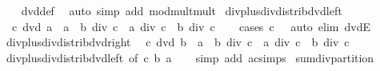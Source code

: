 \begin{isabellebody}
%
\isadelimproof
\ \ %
\endisadelimproof
%
\isatagproof
{}\isamarkupfalse%
\ dvd{\isacharunderscore}{\kern0pt}def\ \isamarkupfalse%
\ {\isacharparenleft}{\kern0pt}auto\ simp\ add{\isacharcolon}{\kern0pt}\ mod{\isacharunderscore}{\kern0pt}mult{\isacharunderscore}{\kern0pt}mult{}{\isacharparenright}{\kern0pt}%
\endisatagproof
{\isafoldproof}%
%
\isadelimproof
\isanewline
%
\endisadelimproof
\isanewline
{}\isamarkupfalse%
\ div{\isacharunderscore}{\kern0pt}plus{\isacharunderscore}{\kern0pt}div{\isacharunderscore}{\kern0pt}distrib{\isacharunderscore}{\kern0pt}dvd{\isacharunderscore}{\kern0pt}left{\isacharcolon}{\kern0pt}\isanewline
\ \ {\isachardoublequoteopen}c\ dvd\ a\ {\isasymLongrightarrow}\ {\isacharparenleft}{\kern0pt}a\ {\isacharplus}{\kern0pt}\ b{\isacharparenright}{\kern0pt}\ div\ c\ {\isacharequal}{\kern0pt}\ a\ div\ c\ {\isacharplus}{\kern0pt}\ b\ div\ c{\isachardoublequoteclose}\isanewline
%
\isadelimproof
\ \ %
\endisadelimproof
%
\isatagproof
{}\isamarkupfalse%
\ {\isacharparenleft}{\kern0pt}cases\ {\isachardoublequoteopen}c\ {\isacharequal}{\kern0pt}\ {}{\isachardoublequoteclose}{\isacharparenright}{\kern0pt}\ {\isacharparenleft}{\kern0pt}auto\ elim{\isacharcolon}{\kern0pt}\ dvdE{\isacharparenright}{\kern0pt}%
\endisatagproof
{\isafoldproof}%
%
\isadelimproof
\isanewline
%
\endisadelimproof
\isanewline
{}\isamarkupfalse%
\ div{\isacharunderscore}{\kern0pt}plus{\isacharunderscore}{\kern0pt}div{\isacharunderscore}{\kern0pt}distrib{\isacharunderscore}{\kern0pt}dvd{\isacharunderscore}{\kern0pt}right{\isacharcolon}{\kern0pt}\isanewline
\ \ {\isachardoublequoteopen}c\ dvd\ b\ {\isasymLongrightarrow}\ {\isacharparenleft}{\kern0pt}a\ {\isacharplus}{\kern0pt}\ b{\isacharparenright}{\kern0pt}\ div\ c\ {\isacharequal}{\kern0pt}\ a\ div\ c\ {\isacharplus}{\kern0pt}\ b\ div\ c{\isachardoublequoteclose}\isanewline
%
\isadelimproof
\ \ %
\endisadelimproof
%
\isatagproof
{}\isamarkupfalse%
\ div{\isacharunderscore}{\kern0pt}plus{\isacharunderscore}{\kern0pt}div{\isacharunderscore}{\kern0pt}distrib{\isacharunderscore}{\kern0pt}dvd{\isacharunderscore}{\kern0pt}left\ {\isacharbrackleft}{\kern0pt}of\ c\ b\ a{\isacharbrackright}{\kern0pt}\isanewline
\ \ \isamarkupfalse%
\ {\isacharparenleft}{\kern0pt}simp\ add{\isacharcolon}{\kern0pt}\ ac{\isacharunderscore}{\kern0pt}simps{\isacharparenright}{\kern0pt}%
\endisatagproof
{\isafoldproof}%
%
\isadelimproof
\isanewline
%
\endisadelimproof
\isanewline
{}\isamarkupfalse%
\ sum{\isacharunderscore}{\kern0pt}div{\isacharunderscore}{\kern0pt}partition{\isacharcolon}{\kern0pt}\isanewline

\end{isabellebody}
